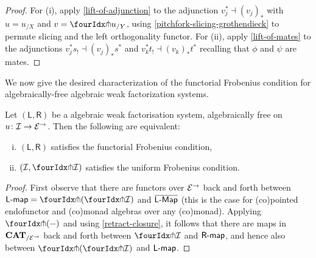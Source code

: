 \documentclass[reqno,10pt,a4paper,oneside,draft]{amsart}
\newcommand{\LL}{\mathsf{L}}
\newcommand{\RR}{\mathsf{R}}
\begin{document}
{{\begin{proof} For (i), apply \cref{lift-of-adjunction} to the adjunction $v_j^* \dashv (v_j)_*$ with $u = u_{/X}$ and $v = {\liftr{u}}_{/Y}$, using \cref{pitchfork-slicing-grothendieck} to permute slicing and the left orthogonality functor. For (ii), apply \cref{lift-of-mates} to  
the adjunctions $v_j^* s_! \dashv (v_j)_* s^*$ and $v_k^* t_! \dashv (v_k)_* t^*$ recalling that $\phi$ and $\psi$ are mates.
\end{proof}




We now give the desired characterization of the functorial Frobenius condition for algebraically-free algebraic weak factorization systems.




\begin{theorem} \label{thm:frobenius-comparison}
Let $(\LL, \RR)$ be a algebraic weak factorisation system, algebraically free on $u \co \cal{I} \to \cal{E}^\to$. Then the following
are equivalent:
\begin{enumerate}[(i)] 
\item  $(\LL, \RR)$ satisfies the functorial Frobenius condition,
\item $(\cal{I}, \liftr{\cal{I}})$ satisfies the uniform Frobenius condition.
\end{enumerate}
\end{theorem}

\begin{proof} First observe that there are functors over $\cal{E}^\to$ back and forth between $\pcoalg{\LL} = \liftl{(\liftr{\cal{I}})}$ and $\overline{\pCoalg{\LL}}$ (this is the case for (co)pointed endofunctor and (co)monad algebras over any (co)monad).
Applying $\liftr{(-)}$ and using \cref{retract-closure}, it follows that there are maps in $\CAT_{/\cal{E}^\to}$ back and forth between $\liftr{\cal{I}}$ and $\palg{\RR}$, and hence also between $\liftl{(\liftr{\cal{I}})}$ and $\pcoalg{\LL}$.


\end{proof}}}
\end{document}
